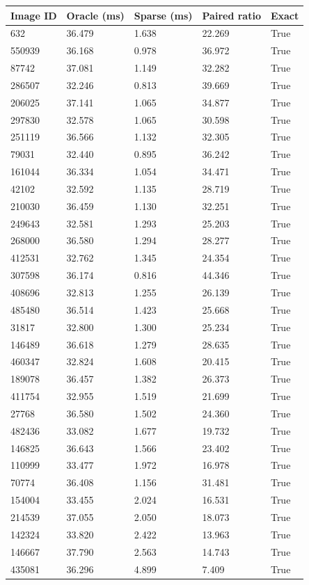 \begin{tabular}{lllll}
\hline
Image ID & Oracle (ms) & Sparse (ms) & Paired ratio & Exact \\
\hline
632 & 36.479 & 1.638 & 22.269 & True \\
550939 & 36.168 & 0.978 & 36.972 & True \\
87742 & 37.081 & 1.149 & 32.282 & True \\
286507 & 32.246 & 0.813 & 39.669 & True \\
206025 & 37.141 & 1.065 & 34.877 & True \\
297830 & 32.578 & 1.065 & 30.598 & True \\
251119 & 36.566 & 1.132 & 32.305 & True \\
79031 & 32.440 & 0.895 & 36.242 & True \\
161044 & 36.334 & 1.054 & 34.471 & True \\
42102 & 32.592 & 1.135 & 28.719 & True \\
210030 & 36.459 & 1.130 & 32.251 & True \\
249643 & 32.581 & 1.293 & 25.203 & True \\
268000 & 36.580 & 1.294 & 28.277 & True \\
412531 & 32.762 & 1.345 & 24.354 & True \\
307598 & 36.174 & 0.816 & 44.346 & True \\
408696 & 32.813 & 1.255 & 26.139 & True \\
485480 & 36.514 & 1.423 & 25.668 & True \\
31817 & 32.800 & 1.300 & 25.234 & True \\
146489 & 36.618 & 1.279 & 28.635 & True \\
460347 & 32.824 & 1.608 & 20.415 & True \\
189078 & 36.457 & 1.382 & 26.373 & True \\
411754 & 32.955 & 1.519 & 21.699 & True \\
27768 & 36.580 & 1.502 & 24.360 & True \\
482436 & 33.082 & 1.677 & 19.732 & True \\
146825 & 36.643 & 1.566 & 23.402 & True \\
110999 & 33.477 & 1.972 & 16.978 & True \\
70774 & 36.408 & 1.156 & 31.481 & True \\
154004 & 33.455 & 2.024 & 16.531 & True \\
214539 & 37.055 & 2.050 & 18.073 & True \\
142324 & 33.820 & 2.422 & 13.963 & True \\
146667 & 37.790 & 2.563 & 14.743 & True \\
435081 & 36.296 & 4.899 & 7.409 & True \\
\hline
\end{tabular}
